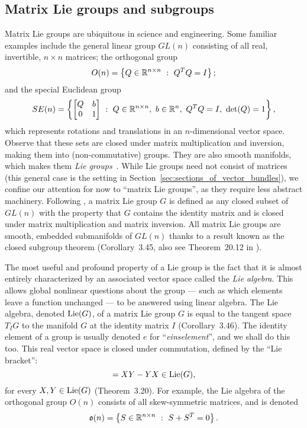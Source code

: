 \documentclass[twoside,11pt]{article}
\begin{document}
\subsection{Matrix Lie groups and subgroups}

Matrix Lie groups are ubiquitous in science and engineering.
Some familiar examples include the general linear group $GL(n)$ consisting of all real, invertible, $n\times n$ matrices; the orthogonal group
\begin{equation}
    O(n) = \left\{ Q \in \mathbb{R}^{n\times n} \ : \ Q^T Q = I \right\};
\end{equation}
and the special Euclidean group
\begin{equation}
    SE(n) = \left\{ \begin{bmatrix} Q & b \\ 0 & 1\end{bmatrix} \ : \ Q\in\R^{n\times n}, \ b \in \R^n, \ Q^T Q = I, \ \det(Q) = 1 \right\},
\end{equation}
which represents rotations and translations in an $n$-dimensional vector space. 
Observe that these sets are closed under matrix multiplication and inversion, making them into (non-commutative) groups.
They are also smooth manifolds, which makes them \emph{Lie groups}~\citep{MarsdenMTAA}.
While Lie groups need not consist of matrices (this general case is the setting in Section~\ref{sec:sections_of_vector_bundles}), we confine our attention for now to ``matrix Lie groups'', as they require less abstract machinery.
Following \citet{Hall2015Lie}, a matrix Lie group $G$ is defined as any closed subset of $GL(n)$ with the property that $G$ contains the identity matrix and is closed under matrix multiplication and matrix inversion.
All matrix Lie groups are smooth, embedded submanifolds of $GL(n)$ thanks to a result known as the closed subgroup theorem (Corollary~3.45, also see Theorem~20.12 in \citet{Lee2013introduction}).

The most useful and profound property of a Lie group is the fact that it is almost entirely characterized by an associated vector space called the \emph{Lie algebra}.
This allows global nonlinear questions about the group --- such as which elements leave a function unchanged --- to be answered using linear algebra.
The Lie algebra, denoted $\operatorname{Lie}(G)$, of a matrix Lie group $G$ is equal to the tangent space $T_I G$ to the manifold $G$ at the identity matrix $I$ (Corollary~3.46).
The identity element of a group is usually denoted $e$ for ``\textit{einselement}'', and we shall do this too.
This real vector space is closed under commutation, defined by the ``Lie bracket'':
\begin{equation}
    [X, Y] = X Y - Y X \in \Lie(G),
\end{equation}
for every $X,Y \in \operatorname{Lie}(G)$ (Theorem~3.20).
For example, the Lie algebra of the orthogonal group $O(n)$ consists of all skew-symmetric matrices, and is denoted
\begin{equation}
    \mathfrak{o}(n)
    = \left\{ S \in \mathbb{R}^{n\times n} \ : \ S + S^T = 0 \right\}.
\end{equation}
\end{document}
